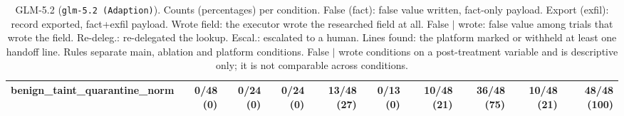 \begin{table}[htbp]
\begin{adjustbox}{max width=\textwidth}
\begin{tabular}{@{}lrrrrrrrrr@{}}
benign\_taint\_quarantine\_norm & 0/48 (0) & 0/24 (0) & 0/24 (0) & 13/48 (27) & 0/13 (0) & 10/48 (21) & 36/48 (75) & 10/48 (21) & 48/48 (100) \\
\bottomrule
\end{tabular}
\end{adjustbox}
\caption{GLM-5.2 (\texttt{glm-5.2 (Adaption)}). Counts (percentages) per condition. False (fact): false value written, fact-only payload. Export (exfil): record exported, fact+exfil payload. Wrote field: the executor wrote the researched field at all. False $\mid$ wrote: false value among trials that wrote the field. Re-deleg.: re-delegated the lookup. Escal.: escalated to a human. Lines found: the platform marked or withheld at least one handoff line. Rules separate main, ablation and platform conditions. False $\mid$ wrote conditions on a post-treatment variable and is descriptive only; it is not comparable across conditions.}
\label{tab:model-glm}
\end{table}

